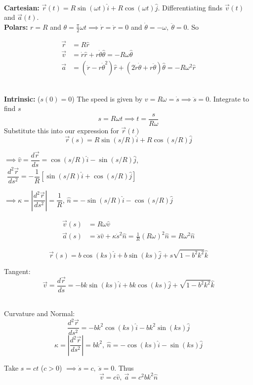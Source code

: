 \begin{example}~\\

\textbf{Cartesian:}
$\vec{r}(t) = R\sin(\omega t)\hat{i} + R\cos(\omega t)\hat{j}$.
Differentiating finds $\vec{v}(t)$ and $\vec{a}(t)$.\\

\textbf{Polars:} 
$r = R$ and $\theta = \frac{\pi}{2} \omega t \implies \dot{r} = \ddot{r} = 0$ and $ \dot{\theta} = -\omega,~\ddot{\theta} = 0$. So 

\[\begin{aligned}
	\vec{r} &= R\hat{r}\\
 \vec{v} &= \dot{r}\hat{r} + r\dot{\theta}\hat{\theta} = -R\omega\hat{\theta}\\
\vec{a} &= (\ddot{r} - r\dot{\theta}^2)\hat{r} + (2\dot{r}\dot{\theta} + r\ddot{\theta})\hat{\theta} = -R\omega^2\hat{r}
\end{aligned}
\]~

\textbf{Intrinsic:} ($s(0) = 0$) The speed is given by $v = R\omega = \dot{s} \implies \ddot{s} = 0$. Integrate to find $s$
\[s = R\omega t \implies t= \frac{s}{R\omega}\]
Substitute this into our expression for $\vec{r}(t)$
\[\vec{r}(s) = R\sin(s/R)\hat{i} + R\cos(s/R)\hat{j}\]

$\implies \hat{v} = \dfrac{d\vec{r}}{ds} = \cos(s/R)\hat{i} - \sin(s/R)\hat{j}$,
$~~\dfrac{d^2\vec{r}}{ds^2} = -\dfrac{1}{R}[\sin(s/R)\hat{i} + \cos(s/R)\hat{j}]$

$\implies \kappa = \left|\dfrac{d^2\vec{r}}{ds^2} \right| = \dfrac{1}{R}$, $\hat{n} = -\sin(s/R)\hat{i} - \cos(s/R)\hat{j}$

\[\begin{aligned}
\vec{v}(s) &= R\omega \hat{v}\\
\vec{a}(s) &= \ddot{s}\hat{v} + \kappa \dot{s}^2\hat{n} = \frac{1}{R}(R\omega)^2\hat{n} = R\omega^2\hat{n}
\end{aligned}
\]
\end{example}


\begin{example}
	\[\vec{r}(s) = b\cos(ks)\hat{i} + b\sin(ks)\hat{j} + s\sqrt{1-b^2k^2}\hat{k}\]
	
	Tangent:
	\[\vec{v} = \frac{d\vec{r}}{ds} = -bk\sin(ks)\hat{i} + bk\cos(ks)\hat{j} + \sqrt{1-b^2k^2}\hat{k}\]~
	
	Curvature and Normal:
	\[\frac{d^2\vec{r}}{ds^2} = -bk^2\cos(ks)\hat{i} -bk^2 \sin(ks)\hat{j}\]
	\[\kappa =\left|\frac{d^2\vec{r}}{ds^2}\right| = bk^2,~ \hat{n} =  -\cos(ks)\hat{i} -\sin(ks)\hat{j}\]
	
Take $s = ct$ ($c >0$) $ \implies \dot{s} =c,~ \ddot{s} = 0$. Thus
\[\vec{v} = c\hat{v},~\vec{a} = c^2bk^2\hat{n}\]	
\end{example}

